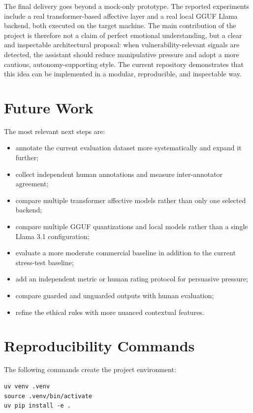 \documentclass[11pt,a4paper]{article}
\begin{document}
The final delivery goes beyond a mock-only prototype. The reported experiments include a real
transformer-based affective layer and a real local GGUF Llama backend, both executed on the
target machine. The main contribution of the project is therefore not a claim of perfect
emotional understanding, but a clear and inspectable architectural proposal: when
vulnerability-relevant signals are detected, the assistant should reduce manipulative
pressure and adopt a more cautious, autonomy-supporting style. The current repository
demonstrates that this idea can be implemented in a modular, reproducible, and inspectable
way.

\section{Future Work}

The most relevant next steps are:

\begin{itemize}[leftmargin=1.8em]
\item annotate the current evaluation dataset more systematically and expand it further;
\item collect independent human annotations and measure inter-annotator agreement;
\item compare multiple transformer affective models rather than only one selected backend;
\item compare multiple GGUF quantizations and local models rather than a single Llama 3.1
configuration;
\item evaluate a more moderate commercial baseline in addition to the current stress-test
baseline;
\item add an independent metric or human rating protocol for persuasive pressure;
\item compare guarded and unguarded outputs with human evaluation;
\item refine the ethical rules with more nuanced contextual features.
\end{itemize}

\appendix

\section{Reproducibility Commands}

The following commands create the project environment:

\begin{lstlisting}[style=reportstyle]
uv venv .venv
source .venv/bin/activate
uv pip install -e .
\end{lstlisting}
\end{document}
